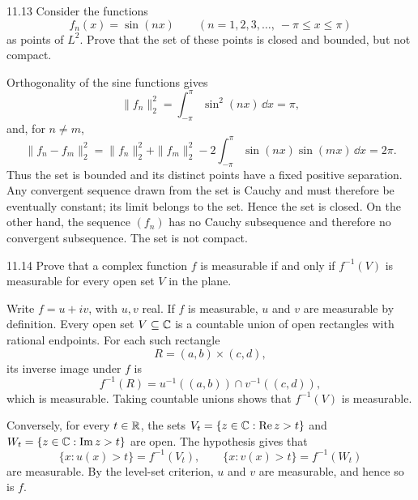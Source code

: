 \documentclass[11pt,oneside]{article}
\begin{document}
\begin{exercise}{11.13}
Consider the functions
\[
 f_n(x)=\sin(nx)\qquad(n=1,2,3,\ldots,\ -\pi\le x\le\pi)
\]
as points of $L^2$. Prove that the set of these points is closed and bounded, but not compact.
\end{exercise}
\begin{solution}
Orthogonality of the sine functions gives
\[
 \|f_n\|_2^2=\int_{-\pi}^\pi\sin^2(nx)\,\dd x=\pi,
\]
and, for $n\ne m$,
\[
 \|f_n-f_m\|_2^2
 =\|f_n\|_2^2+\|f_m\|_2^2
   -2\int_{-\pi}^\pi\sin(nx)\sin(mx)\,\dd x
 =2\pi.
\]
Thus the set is bounded and its distinct points have a fixed positive separation. Any convergent sequence drawn from the set is Cauchy and must therefore be eventually constant; its limit belongs to the set. Hence the set is closed. On the other hand, the sequence $(f_n)$ has no Cauchy subsequence and therefore no convergent subsequence. The set is not compact.
\end{solution}

\begin{exercise}{11.14}
Prove that a complex function $f$ is measurable if and only if $f^{-1}(V)$ is measurable for every open set $V$ in the plane.
\end{exercise}
\begin{solution}
Write $f=u+iv$, with $u,v$ real. If $f$ is measurable, $u$ and $v$ are measurable by definition. Every open set $V\subseteq\mathbb{C}$ is a countable union of open rectangles with rational endpoints. For each such rectangle
\[
 R=(a,b)\times(c,d),
\]
its inverse image under $f$ is
\[
 f^{-1}(R)=u^{-1}((a,b))\cap v^{-1}((c,d)),
\]
which is measurable. Taking countable unions shows that $f^{-1}(V)$ is measurable.

Conversely, for every $t\in\mathbb{R}$, the sets
$V_t=\{z\in\mathbb{C}:\operatorname{Re}z>t\}$ and
$W_t=\{z\in\mathbb{C}:\operatorname{Im}z>t\}$ are open. The hypothesis gives that
\[
 \{x:u(x)>t\}=f^{-1}(V_t),\qquad
 \{x:v(x)>t\}=f^{-1}(W_t)
\]
are measurable. By the level-set criterion, $u$ and $v$ are measurable, and hence so is $f$.
\end{solution}
\end{document}
